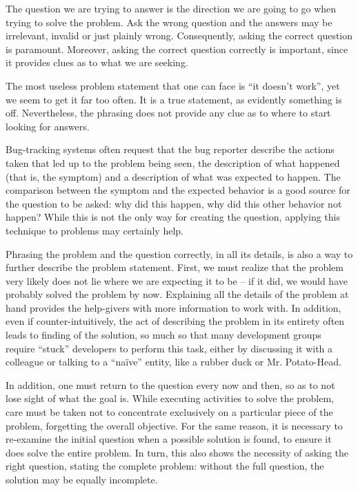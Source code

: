 The question we are trying to answer is the direction we are going to go when
trying to solve the problem. Ask the wrong question and the answers may be
irrelevant, invalid or just plainly wrong. Consequently, asking the correct
question is paramount. Moreover, asking the correct question correctly is
important, since it provides clues as to what we are seeking.

The most useless problem statement that one can face is ``it doesn’t work'', yet
we seem to get it far too often. It is a true statement, as evidently something
is off. Nevertheless, the phrasing does not provide any clue as to where to
start looking for answers.

Bug-tracking systems often request that the bug reporter describe the actions
taken that led up to the problem being seen, the description of what happened
(that is, the symptom) and a description of what was expected to happen. The
comparison between the symptom and the expected behavior is a good source for
the question to be asked: why did this happen, why did this other behavior not
happen? While this is not the only way for creating the question, applying this
technique to problems may certainly help.

Phrasing the problem and the question correctly, in all its details, is also a
way to further describe the problem statement. First, we must realize that the problem very likely does not lie where we are expecting it to be -- if it did, we would have probably solved the problem by now. Explaining all the details of the problem at hand provides the help-givers with more information to work with. In addition, even if counter-intuitively, the act of describing the problem in its entirety often leads to finding of the solution, so much so that many development groups require ``stuck'' developers to perform this task, either by discussing it with a colleague or talking to a ``naïve'' entity, like a rubber duck or Mr. Potato-Head.

In addition, one must return to the question every now and then, so as to not
lose sight of what the goal is. While executing activities to solve the problem,
care must be taken not to concentrate exclusively on a particular piece of the
problem, forgetting the overall objective. For the same reason, it is necessary
to re-examine the initial question when a possible solution is found, to ensure
it does solve the entire problem. In turn, this also shows the necessity of
asking the right question, stating the complete problem: without the full
question, the solution may be equally incomplete.

